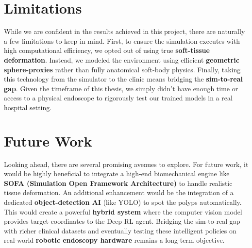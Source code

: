 \section{Limitations}

While we are confident in the results achieved in this project, there are naturally a few limitations to keep in mind. First, to ensure the simulation executes with high computational efficiency, we opted out of using true \textbf{soft-tissue deformation}. Instead, we modeled the environment using efficient \textbf{geometric sphere-proxies} rather than fully anatomical soft-body physics. Finally, taking this technology from the simulator to the clinic means bridging the \textbf{sim-to-real gap}. Given the timeframe of this thesis, we simply didn't have enough time or access to a physical endoscope to rigorously test our trained models in a real hospital setting.

\section{Future Work}

Looking ahead, there are several promising avenues to explore. For future work, it would be highly beneficial to integrate a high-end biomechanical engine like \textbf{SOFA (Simulation Open Framework Architecture)} to handle realistic tissue deformation. An additional enhancement would be the integration of a dedicated \textbf{object-detection AI} (like YOLO) to spot the polyps automatically. This would create a powerful \textbf{hybrid system} where the computer vision model provides target coordinates to the Deep RL agent. Bridging the sim-to-real gap with richer clinical datasets and eventually testing these intelligent policies on real-world \textbf{robotic endoscopy hardware} remains a long-term objective.

